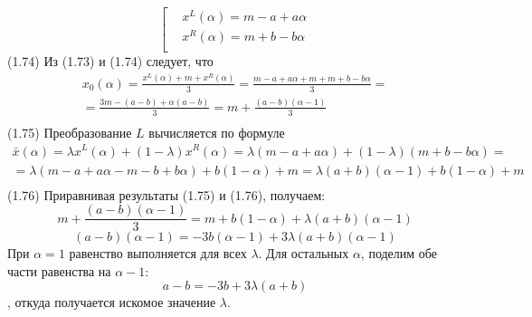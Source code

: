 	\[\left[ \begin{aligned}
  & {{x}^{L}}\left( \alpha  \right)=m-a+a\alpha  \\ 
 & {{x}^{R}}\left( \alpha  \right)=m+b-b\alpha  \\ 
\end{aligned} \right.\] 	(1.74)
Из (1.73) и (1.74) следует, что
	\[\begin{matrix}
  {{x}_{0}}\left( \alpha  \right)=\frac{{{x}^{L}}\left( \alpha  \right)+m+{{x}^{R}}\left( \alpha  \right)}{3}=\frac{m-a+a\alpha +m+m+b-b\alpha }{3}= \\ 
  =\frac{3m-\left( a-b \right)+\alpha \left( a-b \right)}{3}=m+\frac{\left( a-b \right)\left( \alpha -1 \right)}{3} \\ 
\end{matrix}\] 	(1.75)
Преобразование $L$ вычисляется по формуле
	\[\begin{matrix}
  \bar{x}\left( \alpha  \right)=\lambda {{x}^{L}}\left( \alpha  \right)+\left( 1-\lambda  \right){{x}^{R}}\left( \alpha  \right)=\lambda \left( m-a+a\alpha  \right)+\left( 1-\lambda  \right)\left( m+b-b\alpha  \right)= \\ 
  =\lambda \left( m-a+a\alpha -m-b+b\alpha  \right)+b\left( 1-\alpha  \right)+m=\lambda \left( a+b \right)\left( \alpha -1 \right)+b\left( 1-\alpha  \right)+m \\ 
\end{matrix}\] 	(1.76)
Приравнивая результаты (1.75) и (1.76), получаем:
	\[m+\frac{\left( a-b \right)\left( \alpha -1 \right)}{3}=m+b\left( 1-\alpha  \right)+\lambda \left( a+b \right)\left( \alpha -1 \right)\] 
	\[\left( a-b \right)\left( \alpha -1 \right)=-3b\left( \alpha -1 \right)+3\lambda \left( a+b \right)\left( \alpha -1 \right)\] 
При $\alpha =1$ равенство выполняется для всех $\lambda $. Для остальных $\alpha $, поделим обе части равенства на $\alpha -1$:
	\[a-b=-3b+3\lambda \left( a+b \right)\],
откуда получается искомое значение $\lambda $.

